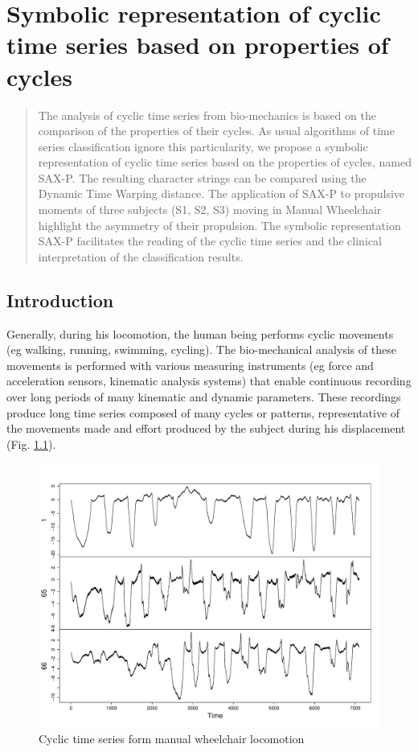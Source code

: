 \chapter[SAX-P]{Symbolic representation of cyclic time series based on properties of cycles}
\begin{abstract} 
The analysis of cyclic time series from bio-mechanics is based on the
comparison of the properties of their cycles. As usual algorithms of time 
series classification ignore this particularity, we propose
a symbolic representation of cyclic time series based on the properties
of cycles, named SAX-P. The resulting character strings can be compared
using the Dynamic Time Warping distance. The application of SAX-P
to propulsive moments of three subjects (S1, S2, S3) moving in Manual
Wheelchair highlight the asymmetry of their propulsion. The symbolic representation 
SAX-P facilitates the reading of
the cyclic time series and the clinical interpretation of the classification results.

\end{abstract} 

\section{Introduction}
\label{introduction}

Generally, during his locomotion, the human being performs cyclic movements (eg walking, running, swimming,
cycling). The bio-mechanical analysis of these movements is performed with various measuring instruments 
(eg force and acceleration sensors, kinematic analysis systems) that enable continuous recording over 
long periods of many kinematic and dynamic parameters. These recordings produce long
time series composed of many cycles or patterns, representative of the movements made and effort 
produced by the subject during his displacement (Fig. \ref{fig:cyclicTS}).


 \begin{figure}[h]
  \centering
   \includegraphics[scale=0.4]{images/sax-p/cycliqueTS}
    \caption{Cyclic time series form manual wheelchair locomotion}
  \label{fig:cyclicTS}
  \end{figure}



